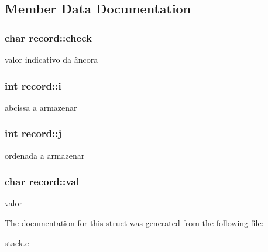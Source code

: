 \subsection{Member Data Documentation}
\hypertarget{structrecord_a381a80a513768c3eba6b765c5e356bad}{
\subsubsection[{check}]{\setlength{\rightskip}{0pt plus 5cm}char record\+::check}}\label{structrecord_a381a80a513768c3eba6b765c5e356bad}
valor indicativo da âncora \hypertarget{structrecord_ac301c80bc2c4273893b6d0b1045ebe4d}{
\subsubsection[{i}]{\setlength{\rightskip}{0pt plus 5cm}int record\+::i}}\label{structrecord_ac301c80bc2c4273893b6d0b1045ebe4d}
abcissa a armazenar \hypertarget{structrecord_a2c7b952c343a645f913aba063ac6bd8a}{
\subsubsection[{j}]{\setlength{\rightskip}{0pt plus 5cm}int record\+::j}}\label{structrecord_a2c7b952c343a645f913aba063ac6bd8a}
ordenada a armazenar \hypertarget{structrecord_a125d17b59037591de0a682688802f670}{
\subsubsection[{val}]{\setlength{\rightskip}{0pt plus 5cm}char record\+::val}}\label{structrecord_a125d17b59037591de0a682688802f670}
valor 

The documentation for this struct was generated from the following file\+:\begin{DoxyCompactItemize}
\item 
\hyperlink{stack_8c}{stack.\+c}\end{DoxyCompactItemize}
